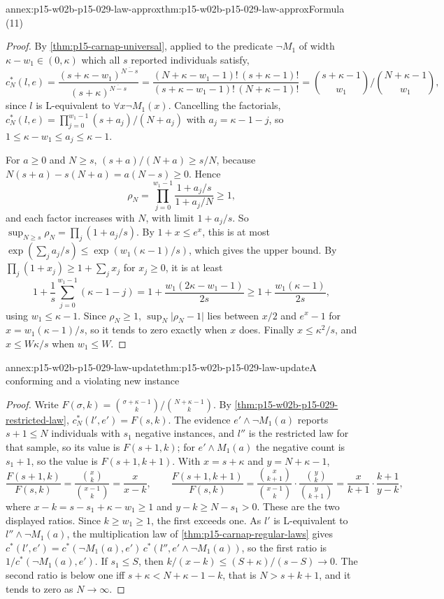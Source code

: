 \begin{annexitem}{annex:p15-w02b-p15-029-law-approx}{thm:p15-w02b-p15-029-law-approx}{Formula (11)}
\begin{proof}
By \cref{thm:p15-carnap-universal}, applied to the predicate
\(\neg M_1\) of width \(\kappa-w_1\in(0,\kappa)\) which all \(s\)
reported individuals satisfy,
\[
 c^*_N(l,e)=\frac{(s+\kappa-w_1)^{\overline{N-s}}}{(s+\kappa)^{\overline{N-s}}}
 =\frac{(N+\kappa-w_1-1)!\,(s+\kappa-1)!}{(s+\kappa-w_1-1)!\,(N+\kappa-1)!}
 =\binom{s+\kappa-1}{w_1}\Big/\binom{N+\kappa-1}{w_1},
\]
since \(l\) is L-equivalent to \(\forall x\neg M_1(x)\). Cancelling
the factorials,
\(c^*_N(l,e)=\prod_{j=0}^{w_1-1}(s+a_j)/(N+a_j)\) with
\(a_j=\kappa-1-j\), so \(1\leq\kappa-w_1\leq a_j\leq\kappa-1\).

For \(a\geq0\) and \(N\geq s\), \((s+a)/(N+a)\geq s/N\), because
\(N(s+a)-s(N+a)=a(N-s)\geq0\). Hence
\[
 \rho_N=\prod_{j=0}^{w_1-1}\frac{1+a_j/s}{1+a_j/N}\geq1,
\]
and each factor increases with \(N\), with limit \(1+a_j/s\). So
\(\sup_{N\geq s}\rho_N=\prod_j(1+a_j/s)\). By \(1+x\leq e^x\),
this is at most \(\exp(\sum_ja_j/s)\leq\exp(w_1(\kappa-1)/s)\), which
gives the upper bound. By \(\prod_j(1+x_j)\geq1+\sum_jx_j\) for
\(x_j\geq0\), it is at least
\[
 1+\frac1s\sum_{j=0}^{w_1-1}(\kappa-1-j)
 =1+\frac{w_1(2\kappa-w_1-1)}{2s}\geq1+\frac{w_1(\kappa-1)}{2s},
\]
using \(w_1\leq\kappa-1\). Since \(\rho_N\geq1\),
\(\sup_N\lvert\rho_N-1\rvert\) lies between \(x/2\) and \(e^x-1\) for
\(x=w_1(\kappa-1)/s\), so it tends to zero exactly when \(x\) does.
Finally \(x\leq\kappa^2/s\), and \(x\leq W\kappa/s\) when
\(w_1\leq W\).
\end{proof}
\end{annexitem}

\begin{annexitem}{annex:p15-w02b-p15-029-law-update}{thm:p15-w02b-p15-029-law-update}{A conforming and a violating new instance}
\begin{proof}
Write \(F(\sigma,k)=\binom{\sigma+\kappa-1}k/\binom{N+\kappa-1}k\).
By \cref{thm:p15-w02b-p15-029-restricted-law}, \(c^*_N(l',e')=F(s,k)\).
The evidence \(e'\land\neg M_1(a)\) reports \(s+1\leq N\) individuals
with \(s_1\) negative instances, and \(l''\) is the restricted law for
that sample, so its value is \(F(s+1,k)\); for \(e'\land M_1(a)\) the
negative count is \(s_1+1\), so the value is \(F(s+1,k+1)\). With
\(x=s+\kappa\) and \(y=N+\kappa-1\),
\[
 \frac{F(s+1,k)}{F(s,k)}=\frac{\binom xk}{\binom{x-1}k}=\frac x{x-k},
 \qquad
 \frac{F(s+1,k+1)}{F(s,k)}
 =\frac{\binom x{k+1}}{\binom{x-1}k}\cdot\frac{\binom yk}{\binom y{k+1}}
 =\frac x{k+1}\cdot\frac{k+1}{y-k},
\]
where \(x-k=s-s_1+\kappa-w_1\geq1\) and \(y-k\geq N-s_1>0\). These
are the two displayed ratios. Since \(k\geq w_1\geq1\), the first
exceeds one. As \(l'\) is L-equivalent to \(l''\land\neg M_1(a)\), the
multiplication law of \cref{thm:p15-carnap-regular-laws} gives
\(c^*(l',e')=c^*(\neg M_1(a),e')\,c^*(l'',e'\land\neg M_1(a))\), so
the first ratio is \(1/c^*(\neg M_1(a),e')\). If \(s_1\leq S\), then
\(k/(x-k)\leq(S+\kappa)/(s-S)\to0\). The second ratio is below one iff
\(s+\kappa<N+\kappa-1-k\), that is \(N>s+k+1\), and it tends to zero
as \(N\to\infty\).
\end{proof}
\end{annexitem}

